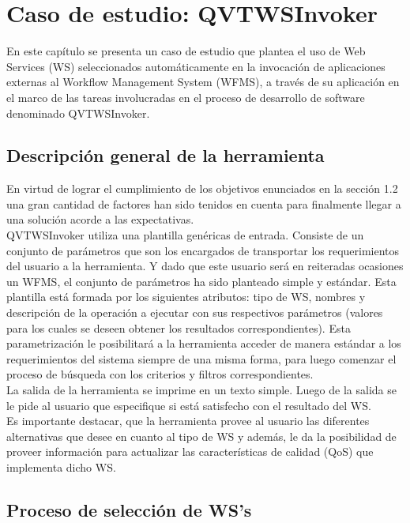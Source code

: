 \chapter{Caso de estudio: QVTWSInvoker}
\label{Caso de estudio: QVTWSInvoker}

En este capítulo se presenta un caso de estudio que plantea el uso de Web Services (WS) seleccionados automáticamente en la invocación de aplicaciones externas al Workflow Management System (WFMS), a través de su aplicación en el marco de las tareas involucradas en el proceso de desarrollo de software denominado QVTWSInvoker.


\section{Descripción general de la herramienta}

En virtud de lograr el cumplimiento de los objetivos enunciados en la sección 1.2 una gran cantidad de factores han sido tenidos en cuenta para finalmente llegar a una solución acorde a las expectativas.\\
QVTWSInvoker utiliza una plantilla genéricas de entrada. Consiste de un conjunto de parámetros que son los encargados de transportar los requerimientos del usuario a la herramienta. Y dado que este usuario será en reiteradas ocasiones un WFMS, el conjunto de parámetros ha sido planteado simple y estándar. Esta plantilla está formada por los siguientes atributos: tipo de WS, nombres y descripción de la operación a ejecutar con sus respectivos parámetros (valores para los cuales se deseen obtener los resultados correspondientes). Esta parametrización le posibilitará a la herramienta acceder de manera estándar a los requerimientos del sistema siempre de una misma forma, para luego comenzar el proceso de búsqueda con los criterios y filtros correspondientes.\\
La salida de la herramienta se imprime en un texto simple. Luego de la salida se le pide al usuario que especifique si está satisfecho con el resultado del WS.\\
Es importante destacar, que la herramienta provee al usuario las diferentes alternativas que desee en cuanto al tipo de WS y además, le da la posibilidad de proveer información para actualizar las características de calidad (QoS) que implementa dicho WS. 

\section{Proceso de selección de WS's}

